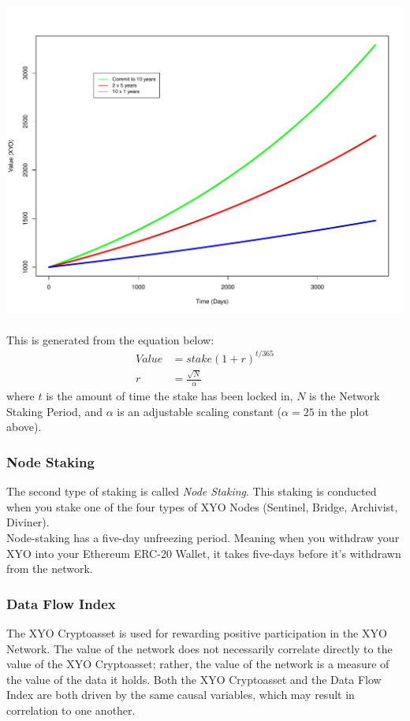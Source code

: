 \documentclass{article}
\begin{document}
\includegraphics[width=\textwidth]{StakingAlgorithm.pdf}
\\\\

This is generated from the equation below:
\begin{align}
    Value &= stake(1+r)^{t/365}\\
    r &= \frac{\sqrt{N}}{\alpha}
\end{align}
where $t$ is the amount of time the stake has been locked in, $N$ is the Network Staking Period, and $\alpha$ is an adjustable scaling constant ($\alpha = 25$ in the plot above).

\subsubsection{Node Staking}

The second type of staking is called \textit{Node Staking}. This staking is conducted when you stake one of the four types of XYO Nodes (Sentinel, Bridge, Archivist, Diviner).\\ 

Node-staking has a five-day unfreezing period. Meaning when you withdraw your XYO into your Ethereum ERC-20 Wallet, it takes five-days before it’s withdrawn from the network.

\subsubsection{Data Flow Index}

The XYO Cryptoasset is used for rewarding positive participation in the XYO Network. The value of the network does not necessarily correlate directly to the value of the XYO Cryptoasset; rather, the value of the network is a measure of the value of the data it holds. Both the XYO Cryptoasset and the Data Flow Index are both driven by the same causal variables, which may result in correlation to one another. \\\\
\end{document}
